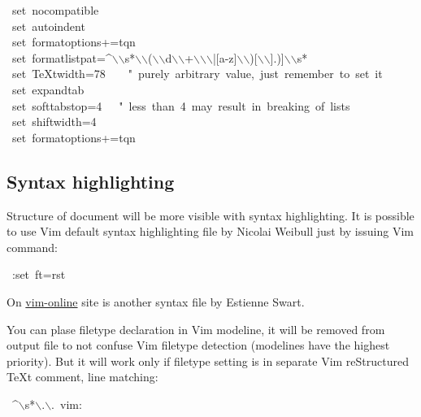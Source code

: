 \documentclass[12pt]{article}
\begin{document}
\begin{ttfamily}\begin{flushleft}
\mbox{~set~nocompatible}\\
\mbox{~set~autoindent}\\
\mbox{~set~formatoptions+=tqn}\\
\mbox{~set~formatlistpat=\^{}$\backslash$$\backslash$s*$\backslash$$\backslash$($\backslash$$\backslash$d$\backslash$$\backslash$+$\backslash$$\backslash$$\backslash$|[a-z]$\backslash$$\backslash$)[$\backslash$$\backslash$].)]$\backslash$$\backslash$s*}\\
\mbox{~set~\TeX{}twidth=78~~~~"~purely~arbitrary~value,~just~remember~to~set~it}\\
\mbox{~set~expandtab}\\
\mbox{~set~softtabstop=4~~~"~less~than~4~may~result~in~breaking~of~lists}\\
\mbox{~set~shiftwidth=4}\\
\mbox{~set~formatoptions+=tqn}\\
\end{flushleft}\end{ttfamily}

\hypertarget{lsyntax-highlighting}{}
\subsection{Syntax highlighting}

Structure of document will be more visible with syntax highlighting. It is
possible to use Vim default syntax highlighting file by Nicolai Weibull just
by issuing Vim command:

\begin{ttfamily}\begin{flushleft}
\mbox{~:set~ft=rst}\\
\end{flushleft}\end{ttfamily}

On \href{http://www.vim.org/scripts/script.php?script_id=973}{vim-online} site is another syntax file by Estienne Swart.

You can plase filetype declaration in Vim modeline, it will be removed from
output file to not confuse Vim filetype detection (modelines have the highest
priority). But it will work only if filetype setting is in separate Vim reStructured \TeX{}t
comment, line matching:

\begin{ttfamily}\begin{flushleft}
\mbox{~\^{}$\backslash$s*$\backslash$.$\backslash$.~vim:}\\
\end{flushleft}\end{ttfamily}
\end{document}

